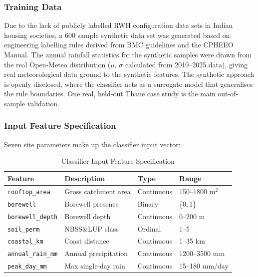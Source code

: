 \documentclass[conference]{IEEEtran}
\begin{document}
\subsubsection{Training Data}
Due to the lack of publicly labelled RWH configuration data sets in Indian
housing societies, a 600 sample synthetic data set was generated based on
engineering labelling rules derived from BMC guidelines and
the CPHEEO Manual. The annual rainfall statistics for the
synthetic samples were drawn from the real Open-Meteo distribution ($\mu$,
$\sigma$ calculated from 2010--2025 data), giving real meteorological data ground to
the synthetic features. The synthetic approach is openly
disclosed, where the classifier acts as a surrogate model that generalises
the rule boundaries. One real, held-out Thane case study is the main
out-of-sample validation.

\subsubsection{Input Feature Specification}
Seven site parameters make up the classifier input vector:

\begin{table}[htbp]
\caption{Classifier Input Feature Specification}
\begin{center}
\begin{tabular}{lp{2.6cm}ll}
\toprule
\textbf{Feature} & \textbf{Description} & \textbf{Type} & \textbf{Range} \\
\midrule
\texttt{rooftop\_area}    & Gross catchment area & Continuous & 150--1800 m$^2$ \\
\texttt{borewell}         & Borewell presence    & Binary     & \{0,\,1\}       \\
\texttt{borewell\_depth}  & Borewell depth       & Continuous & 0--200 m        \\
\texttt{soil\_perm}       & NBSS\&LUP class      & Ordinal    & 1--5            \\
\texttt{coastal\_km}      & Coast distance       & Continuous & 1--35 km        \\
\texttt{annual\_rain\_mm} & Annual precipitation & Continuous & 1200--3500 mm   \\
\texttt{peak\_day\_mm}    & Max single-day rain  & Continuous & 15--180 mm/day  \\
\bottomrule
\end{tabular}
\label{tab:features}
\end{center}
\end{table}
\end{document}
